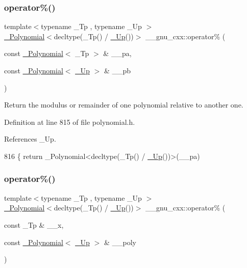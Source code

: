 \subsubsection{\texorpdfstring{operator\%()}{operator\%()}\hspace{0.1cm}{\footnotesize\ttfamily [2/3]}}
{\footnotesize\ttfamily template$<$typename \+\_\+\+Tp , typename \+\_\+\+Up $>$ \\
\hyperlink{class____gnu__cxx_1_1__Polynomial}{\+\_\+\+Polynomial}$<$decltype(\+\_\+\+Tp() / \hyperlink{namespace____gnu__cxx_ab693ea357b6429b331e0bf09f9442385}{\+\_\+\+Up}())$>$ \+\_\+\+\_\+gnu\+\_\+cxx\+::operator\% (\begin{DoxyParamCaption}\item[{const \hyperlink{class____gnu__cxx_1_1__Polynomial}{\+\_\+\+Polynomial}$<$ \+\_\+\+Tp $>$ \&}]{\+\_\+\+\_\+pa,  }\item[{const \hyperlink{class____gnu__cxx_1_1__Polynomial}{\+\_\+\+Polynomial}$<$ \hyperlink{namespace____gnu__cxx_ab693ea357b6429b331e0bf09f9442385}{\+\_\+\+Up} $>$ \&}]{\+\_\+\+\_\+pb }\end{DoxyParamCaption})\hspace{0.3cm}{\ttfamily [inline]}}

Return the modulus or remainder of one polynomial relative to another one. 

Definition at line 815 of file polynomial.\+h.



References \+\_\+\+Up.


\begin{DoxyCode}
816     \{ \textcolor{keywordflow}{return} \_Polynomial<decltype(\_Tp() / \hyperlink{namespace____gnu__cxx_ab693ea357b6429b331e0bf09f9442385}{\_Up}())>(\_\_pa) %
\end{DoxyCode}
\mbox{\label{namespace____gnu__cxx_a2d1e6cb96943b2c99f71cf77a7247e77}} 
\subsubsection{\texorpdfstring{operator\%()}{operator\%()}\hspace{0.1cm}{\footnotesize\ttfamily [3/3]}}
{\footnotesize\ttfamily template$<$typename \+\_\+\+Tp , typename \+\_\+\+Up $>$ \\
\hyperlink{class____gnu__cxx_1_1__Polynomial}{\+\_\+\+Polynomial}$<$decltype(\+\_\+\+Tp() / \hyperlink{namespace____gnu__cxx_ab693ea357b6429b331e0bf09f9442385}{\+\_\+\+Up}())$>$ \+\_\+\+\_\+gnu\+\_\+cxx\+::operator\% (\begin{DoxyParamCaption}\item[{const \+\_\+\+Tp \&}]{\+\_\+\+\_\+x,  }\item[{const \hyperlink{class____gnu__cxx_1_1__Polynomial}{\+\_\+\+Polynomial}$<$ \hyperlink{namespace____gnu__cxx_ab693ea357b6429b331e0bf09f9442385}{\+\_\+\+Up} $>$ \&}]{\+\_\+\+\_\+poly }\end{DoxyParamCaption})\hspace{0.3cm}{\ttfamily [inline]}}

